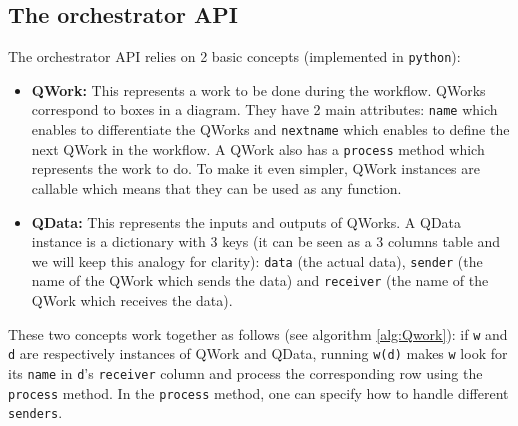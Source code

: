 \documentclass[10pt, conference, compsocconf]{IEEEtran}
\begin{document}
\subsection{The orchestrator API}
The orchestrator API relies on 2 basic concepts (implemented in \texttt{python}): 
\begin{itemize}
\item \textbf{QWork:} This represents a work to be done during the workflow. QWorks correspond to boxes in a diagram. They have 2 main attributes: \texttt{name} which enables to differentiate the QWorks and \texttt{nextname} which enables to define the next QWork in the workflow. A QWork also has a \texttt{process} method which represents the work to do. To make it even simpler, QWork instances are callable which means that they can be used as any function. 
\item \textbf{QData:} This represents the inputs and outputs of QWorks. A QData instance is a dictionary with 3 keys (it can be seen as a 3 columns table and we will keep this analogy for clarity): \texttt{data} (the actual data), \texttt{sender} (the name of the QWork which sends the data) and \texttt{receiver} (the name of the QWork which receives the data). 
\end{itemize}
These two concepts work together as follows (see algorithm \ref{alg:Qwork}): if \texttt{w} and \texttt{d} are respectively instances of QWork and QData, running \texttt{w(d)} makes \texttt{w} look for its \texttt{name} in \texttt{d}'s \texttt{receiver} column and process the corresponding row using the \texttt{process} method. In the \texttt{process} method, one can specify how to handle different \texttt{senders}.
\end{document}
